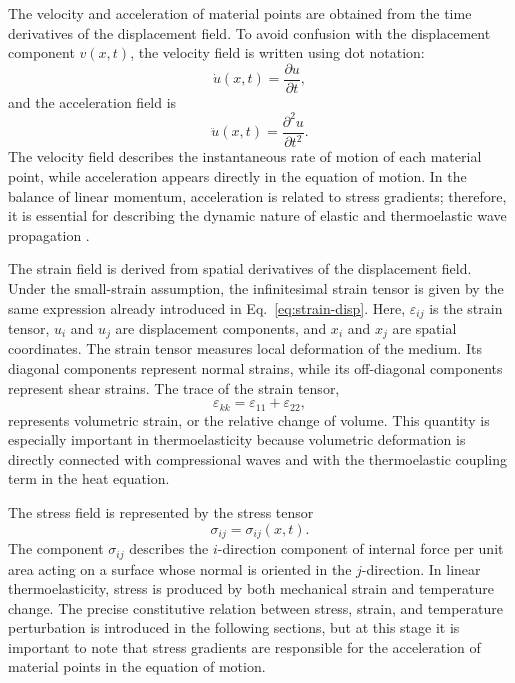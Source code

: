 The velocity and acceleration of material points are obtained from the time derivatives of the displacement field. To avoid confusion with the displacement component \(v(x,t)\), the velocity field is written using dot notation:
\begin{equation}
\dot{u}(x,t)
=
\frac{\partial u}{\partial t},
\end{equation}
and the acceleration field is
\begin{equation}
\ddot{u}(x,t)
=
\frac{\partial^2 u}{\partial t^2}.
\end{equation}
The velocity field describes the instantaneous rate of motion of each material point, while acceleration appears directly in the equation of motion. In the balance of linear momentum, acceleration is related to stress gradients; therefore, it is essential for describing the dynamic nature of elastic and thermoelastic wave propagation \cite{aki2002}.

The strain field is derived from spatial derivatives of the displacement field. Under the small-strain assumption, the infinitesimal strain tensor is given by the same expression already introduced in Eq.~\eqref{eq:strain-disp}.
Here, \(\varepsilon_{ij}\) is the strain tensor, \(u_i\) and \(u_j\) are displacement components, and \(x_i\) and \(x_j\) are spatial coordinates. The strain tensor measures local deformation of the medium. Its diagonal components represent normal strains, while its off-diagonal components represent shear strains. The trace of the strain tensor,
\begin{equation}
\varepsilon_{kk}
=
\varepsilon_{11}
+
\varepsilon_{22},
\end{equation}
represents volumetric strain, or the relative change of volume. This quantity is especially important in thermoelasticity because volumetric deformation is directly connected with compressional waves and with the thermoelastic coupling term in the heat equation.

The stress field is represented by the stress tensor
\begin{equation}
\sigma_{ij} = \sigma_{ij}(x,t).
\end{equation}
The component \(\sigma_{ij}\) describes the \(i\)-direction component of internal force per unit area acting on a surface whose normal is oriented in the \(j\)-direction. In linear thermoelasticity, stress is produced by both mechanical strain and temperature change. The precise constitutive relation between stress, strain, and temperature perturbation is introduced in the following sections, but at this stage it is important to note that stress gradients are responsible for the acceleration of material points in the equation of motion.

